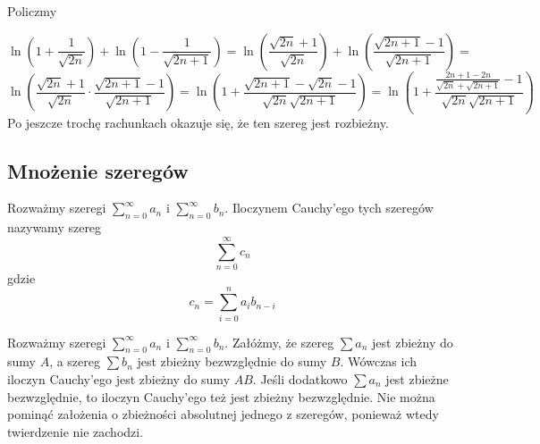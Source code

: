 \documentclass[9pt]{article}
\begin{document}
Policzmy

\[
    \ln\left(1+\frac{1}{\sqrt{2n}}\right) + \ln \left(1-\frac{1}{\sqrt{2n+1}}\right) =
    \ln\left(\frac{\sqrt{2n} + 1}{\sqrt{2n}}\right) + \ln \left(\frac{\sqrt{2n+1}-1}{\sqrt{2n+1}}\right) =
\]
\[
    \ln\left(\frac{\sqrt{2n} + 1}{\sqrt{2n}}\cdot\frac{\sqrt{2n+1}-1}{\sqrt{2n+1}}\right) =
    \ln\left(1 +\frac{\sqrt{2n+1}-\sqrt{2n}-1}{\sqrt{2n}\sqrt{2n+1}}\right) =
    \ln\left(1 +\frac{\frac{2n+1-2n}{\sqrt{2n}+\sqrt{2n+1}}-1}{\sqrt{2n}\sqrt{2n+1}}\right)
\]
Po jeszcze trochę rachunkach okazuje się, że ten szereg jest rozbieżny.

\subsection{Mnożenie szeregów}

\begin{Def} 
    Rozważmy szeregi $\sum_{n = 0}^{\infty} a_n$ i $\sum_{n = 0}^{\infty} b_n$. Iloczynem Cauchy'ego
    tych szeregów nazywamy szereg
    \[
        \sum_{n = 0}^{\infty} c_n
    \]
    gdzie
    \[
        c_n = \sum_{i = 0}^{n} a_i b_{n-i}
    \]
\end{Def}

\begin{Twi}[Martensa]
    Rozważmy szeregi $\sum_{n = 0}^\infty a_n$ i $\sum_{n = 0}^\infty b_n$. Załóżmy, że szereg
    $\sum a_n$ jest zbieżny do sumy $A$, a szereg $\sum b_n$ jest zbieżny bezwzględnie do sumy $B$.
    Wówczas ich iloczyn Cauchy'ego jest zbieżny do sumy $AB$. Jeśli dodatkowo $\sum a_n$ jest
    zbieżne bezwzględnie, to iloczyn Cauchy'ego też jest zbieżny bezwzględnie. Nie można pominąć
    założenia o zbieżności absolutnej jednego z szeregów, ponieważ wtedy twierdzenie nie zachodzi.
\end{Twi}
\end{document}
